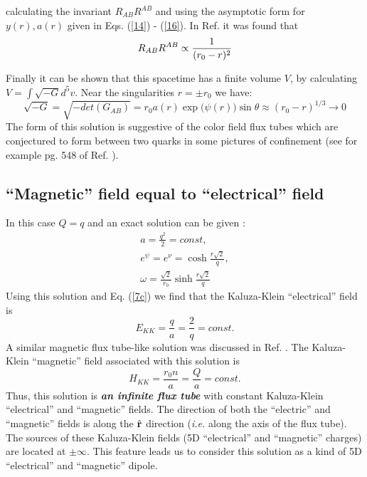 calculating the invariant $R_{AB} R^{AB}$ and using the asymptotic
form for $y(r), a(r)$ given in Eqs. (\ref{14}) - (\ref{16}). In
Ref. \cite{dzhds} it was found that
\begin{equation}
R_{AB} R^{AB} \propto {1 \over (r_0 -r)^2}
\end{equation}
\par 
Finally it can be shown that
this spacetime has a finite volume $V$,
by calculating $V=\int\sqrt{-G}d^5v$. Near the singularities 
$r=\pm r_0$ we have: 
\begin{equation} 
\sqrt{-G} = \sqrt{-det (G_{AB})} = 
r_0 a(r) \exp{(\psi (r)}) \sin\theta 
\approx (r_0 - r)^{1/3} \rightarrow 0 
\label{17}
\end{equation} 
The form of this solution is suggestive of the color field flux 
tubes which are conjectured to form between two quarks 
in some pictures of confinement (see for example pg. 548
of Ref. \cite{peskin}).
\par

\subsection{``Magnetic'' field  equal to ``electrical'' field}

In this case $Q=q$ and an exact solution can be given \cite{dzh4}: 
\begin{eqnarray} 
a = \frac{q^2}{2} = const, 
\label{18}\\
e^{\psi} = e^{\nu} = \cosh\frac{r\sqrt{2}}{q},
\label{19}\\
\omega = \frac{\sqrt{2}}{r_0}\sinh\frac{r\sqrt{2}}{q} 
\label{20}
\end{eqnarray} 
Using this solution and Eq. (\ref{7c}) 
we find that the Kaluza-Klein ``electrical'' field is
\begin{equation} 
E_{KK} = \frac{q}{a} = \frac{2}{q} = const.
\label{23} 
\end{equation}
A similar magnetic flux tube-like solution was discussed in
Ref. \cite{davidson}.
The Kaluza-Klein ``magnetic'' field 
associated with this solution is \cite{dzh4}
\begin{equation}
H_{KK} = \frac{r_0 n}{a} = \frac{Q}{a} = const. 
\label{24}
\end{equation}
Thus, this solution is \textit{\textbf{an infinite flux tube}} 
with constant Kaluza-Klein ``electrical'' and 
``magnetic'' fields. The direction of both the
``electric'' and ``magnetic'' fields is along the
${\hat {\bf r}}$ direction ({\it i.e.} along the axis
of the flux tube). The sources 
of these Kaluza-Klein fields (5D ``electrical'' 
and ``magnetic'' charges) are located at $\pm \infty$. 
This feature leads us to consider this solution as a kind
of 5D  ``electrical'' and ``magnetic'' dipole. 

